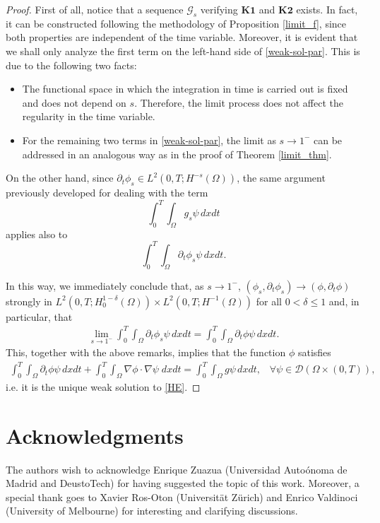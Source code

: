 \documentclass[reqno,twoside]{amsart}
\numberwithin{equation}{section}
\begin{document}
\begin{proof}
First of all, notice that a sequence $\mathcal{G}_s$ verifying $\textbf{K1}$ and $\textbf{K2}$ exists. In fact, it can be constructed following the methodology of Proposition \ref{limit_f}, since both properties are independent of the time variable. Moreover, it is evident that we shall only analyze  the first term on the left-hand side of \eqref{weak-sol-par}. This is due to the following two facts:
\begin{itemize}
	\item The functional space in which the integration in time is carried out is fixed and does not depend on $s$. Therefore, the limit process does not affect the regularity in the time variable.
	
	\item For the remaining two terms in \eqref{weak-sol-par}, the limit as $s\to 1^-$ can be addressed in an analogous way as in the proof of Theorem \ref{limit_thm}.
\end{itemize}

On the other hand, since $\partial_t\phi_s\in L^2(0,T;H^{-s}(\Omega))$, the same argument previously developed for dealing with the term 
\begin{equation*}
	\int_0^T\int_\Omega g_s\psi\,dxdt
\end{equation*}
applies also to
\begin{equation*}
	\int_0^T\int_{\Omega} \partial_t\phi_s\psi\,dxdt.
\end{equation*}

In this way, we immediately conclude that, as $s\to 1^-$, $(\phi_s,\partial_t\phi_s)\to (\phi,\partial_t\phi)$ strongly in $L^2(0,T;H^{1-\delta}_0(\Omega))\times L^2(0,T;H^{-1}(\Omega))$ for all $0<\delta\leq 1$ and, in particular, that 
\begin{align*}
	\lim_{s\to 1^-}\int_0^T\int_{\Omega} \partial_t\phi_s\psi\,dxdt = \int_0^T\int_{\Omega} \partial_t\phi\psi\,dxdt.
\end{align*}
This, together with the above remarks, implies that the function $\phi$ satisfies
\begin{align*}
	\int_0^T \int_\Omega\partial_t\phi\psi\,dxdt + \int_0^T\int_\Omega \nabla\phi\cdot\nabla\psi\;dxdt = \int_0^T\int_\Omega g\psi\,dxdt, \;\;\; \forall\psi\in\mathcal{D}(\Omega\times(0,T)),
\end{align*}
i.e. it is the unique weak solution to \eqref{HE}.
\end{proof}

\section*{Acknowledgments}

The authors wish to acknowledge Enrique Zuazua (Universidad Auto\'onoma de Madrid and DeustoTech) for having suggested the topic of this work. Moreover, a special thank goes to Xavier Ros-Oton (Universit\"at Z\"urich) and Enrico Valdinoci (University of Melbourne) for interesting and clarifying discussions.

\end{document}
